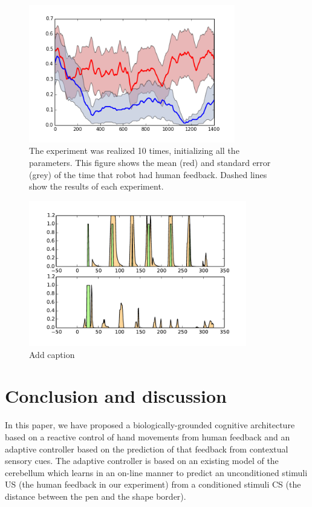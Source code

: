 \documentclass[letterpaper, 10 pt, conference]{ieeeconf}  %
\begin{document}
{\begin{figure}
\centering
\includegraphics[width=9cm]{error}
\caption{The experiment was realized 10 times, initializing all the parameters. This figure shows the mean (red) and standard error (grey) of the time that robot had human feedback. Dashed lines show the results of each experiment. }
\label{fig:error}
\end{figure}

\begin{figure}
\centering
\includegraphics[width=9.5cm]{general}
\caption{Add caption}
\label{fig:general}
\end{figure}

\section{Conclusion and discussion}

In this paper, we have proposed a biologically-grounded cognitive architecture based on a reactive control of hand movements from human feedback and an adaptive controller based on the prediction of that feedback from contextual sensory cues. The adaptive controller is based on an existing model of the cerebellum which learns in an on-line manner to predict an unconditioned stimuli US (the human feedback in our experiment) from a conditioned stimuli CS (the distance between the pen and the shape border). 

}
\end{document}
